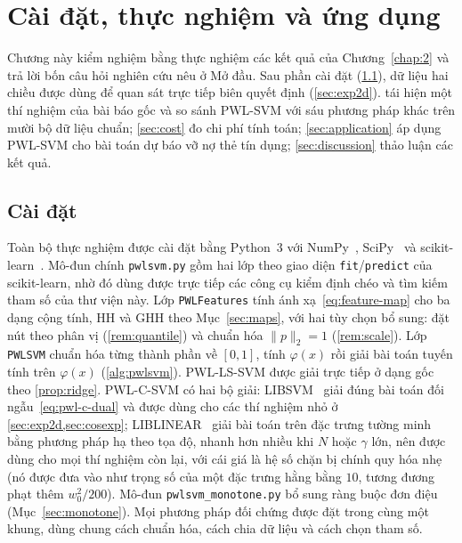 \chapter{Cài đặt, thực nghiệm và ứng dụng}\label{chap:3}

Chương này kiểm nghiệm bằng thực nghiệm các kết quả của Chương~\ref{chap:2} và trả lời bốn câu hỏi nghiên cứu nêu ở Mở đầu. Sau phần cài đặt (\cref{sec:impl}), dữ liệu hai chiều được dùng để quan sát trực tiếp biên quyết định (\cref{sec:exp2d}).  tái hiện một thí nghiệm của bài báo gốc và so sánh PWL-SVM với sáu phương pháp khác trên mười bộ dữ liệu chuẩn; \cref{sec:cost} đo chi phí tính toán; \cref{sec:application} áp dụng PWL-SVM cho bài toán dự báo vỡ nợ thẻ tín dụng; \cref{sec:discussion} thảo luận các kết quả.

\section{Cài đặt}\label{sec:impl}

Toàn bộ thực nghiệm được cài đặt bằng Python~3 với NumPy~\cite{harris2020}, SciPy~\cite{virtanen2020} và scikit-learn~\cite{pedregosa2011}. Mô-đun chính \texttt{pwlsvm.py} gồm hai lớp theo giao diện \texttt{fit}/\texttt{predict} của scikit-learn, nhờ đó dùng được trực tiếp các công cụ kiểm định chéo và tìm kiếm tham số của thư viện này. Lớp \texttt{PWLFeatures} tính ánh xạ~\eqref{eq:feature-map} cho ba dạng cộng tính, HH và GHH theo Mục~\ref{sec:maps}, với hai tùy chọn bổ sung: đặt nút theo phân vị (\cref{rem:quantile}) và chuẩn hóa $\|p\|_2=1$ (\cref{rem:scale}). Lớp \texttt{PWLSVM} chuẩn hóa từng thành phần về $[0,1]$, tính $\varphi(x)$ rồi giải bài toán tuyến tính trên $\varphi(x)$ (\cref{alg:pwlsvm}). PWL-LS-SVM được giải trực tiếp ở dạng gốc theo \cref{prop:ridge}. PWL-C-SVM có hai bộ giải: LIBSVM~\cite{chang2011} giải đúng bài toán đối ngẫu~\eqref{eq:pwl-c-dual} và được dùng cho các thí nghiệm nhỏ ở \cref{sec:exp2d,sec:cosexp}; LIBLINEAR~\cite{fan2008} giải bài toán trên đặc trưng tường minh bằng phương pháp hạ theo tọa độ, nhanh hơn nhiều khi $N$ hoặc $\gamma$ lớn, nên được dùng cho mọi thí nghiệm còn lại, với cái giá là hệ số chặn bị chính quy hóa nhẹ (nó được đưa vào như trọng số của một đặc trưng hằng bằng $10$, tương đương phạt thêm $w_0^2/200$). Mô-đun \texttt{pwlsvm\_monotone.py} bổ sung ràng buộc đơn điệu (Mục~\ref{sec:monotone}). Mọi phương pháp đối chứng được đặt trong cùng một khung, dùng chung cách chuẩn hóa, cách chia dữ liệu và cách chọn tham số.

